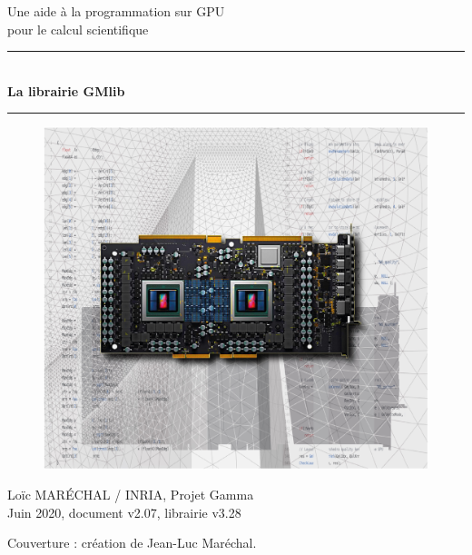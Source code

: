 \documentclass[a4paper,12pt]{article}
\newcommand{\HRule}{\rule{\linewidth}{1mm}}
\begin{document}
%
%

\begin{titlepage}

\begin{center}
\huge Une aide à la programmation sur GPU\\ pour le calcul scientifique
\HRule \\
\medskip
{\Huge \bfseries La librairie GMlib} \\
\HRule
\end{center}

\begin{figure}[htbp]
\begin{center}
\includegraphics[width=15cm]{gpu.jpg}
\end{center}
\end{figure}

\begin{flushright}
\Large Lo\"ic MAR\'ECHAL / INRIA, Projet Gamma \\
\normalsize Juin 2020, document v2.07, librairie v3.28
\end{flushright}

\end{titlepage}

\clearpage

\setcounter{tocdepth}{2}
\tableofcontents
\vfill

\footnotesize{Couverture : création de Jean-Luc Maréchal.}
\normalsize
\end{document}
